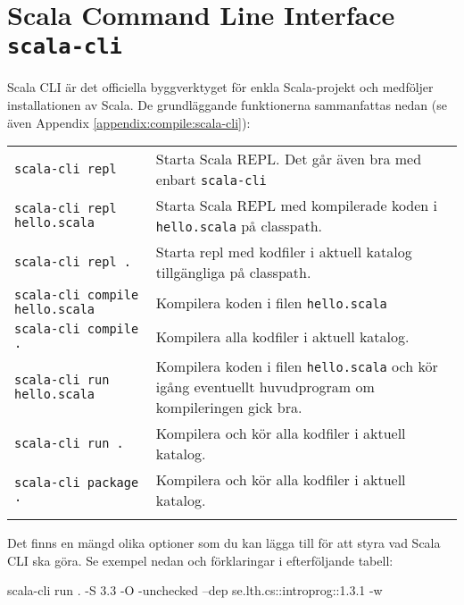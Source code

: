 \section{Scala Command Line Interface \texttt{scala-cli}}\label{appendix:build:scala-cli}

Scala CLI är det officiella byggverktyget för enkla Scala-projekt och medföljer installationen av Scala. 
De grundläggande funktionerna sammanfattas nedan (se även Appendix \ref{appendix:compile:scala-cli}):

\begin{table}[H]
\begin{tabular}{l p{6.5cm}}
\texttt{scala-cli repl} & Starta Scala REPL.  Det går även bra med enbart \texttt{scala-cli}\\
\texttt{scala-cli repl hello.scala} & Starta Scala REPL med kompilerade koden i \texttt{hello.scala} på classpath.  \\
\texttt{scala-cli repl .} & Starta repl med kodfiler i aktuell katalog tillgängliga på classpath. \\
\texttt{scala-cli compile hello.scala} & Kompilera koden i filen \texttt{hello.scala}  \\
\texttt{scala-cli compile .} & Kompilera alla kodfiler i aktuell katalog. \\
\texttt{scala-cli run hello.scala} & Kompilera koden i filen \texttt{hello.scala} och kör igång eventuellt huvudprogram om kompileringen gick bra. \\
\texttt{scala-cli run .} & Kompilera och kör alla kodfiler i aktuell katalog. \\
\texttt{scala-cli package .} & Kompilera och kör alla kodfiler i aktuell katalog. \\
\\
\end{tabular}
\end{table}

	

\noindent Det finns en mängd olika optioner som du kan lägga till för att styra vad Scala CLI ska göra. Se exempel nedan och förklaringar i efterföljande tabell:
\begin{REPLsmall}
scala-cli run . -S 3.3 -O -unchecked --dep se.lth.cs::introprog::1.3.1 -w
\end{REPLsmall}

